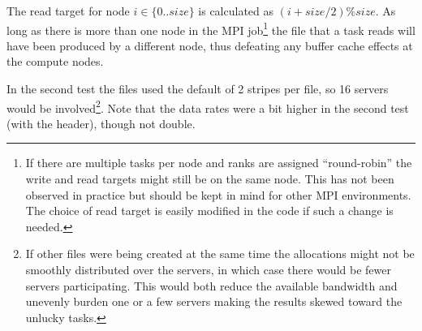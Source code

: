 \documentclass{article}
\begin{document}
The read target for node $i \in \{0..\mbox{$size$}\}$ is calculated as
$(i + \mbox{$size$}/2) \% \mbox{$size$}$.  As long as there is more
than one node in the MPI job\footnote{If there are multiple tasks per
  node and ranks are assigned ``round-robin'' the write and read
  targets might still be on the same node.  This has not been observed
in practice but should be kept in mind for other MPI environments.
The choice of read target is easily modified in the code if such a
change is needed.} the file that a task reads will have
been produced by a different node, thus defeating any buffer cache
effects at the compute nodes.  

In the second test the files used the default of 2 stripes per file,
so 16 servers would be involved\footnote{If other files were being
created at the same time the allocations might not be smoothly
distributed over the servers, in which case there would be fewer
servers participating.  This would both reduce the available bandwidth
and unevenly burden one or a few servers making the results skewed
toward the unlucky tasks.}.  Note that the data rates were a bit
higher in the second test (with the header), though not double.
\end{document}
